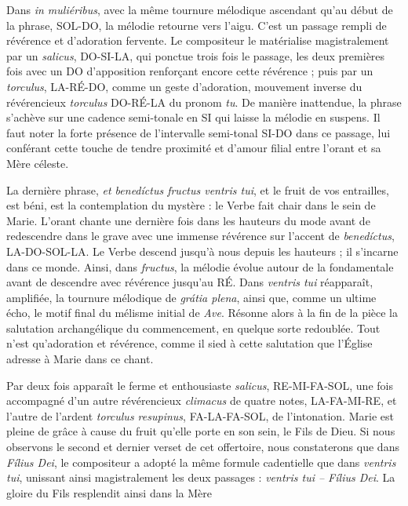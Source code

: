 \documentclass[Session2026.tex]{subfiles}
\begin{document}
Dans \emph{in muliéribus}, avec la même tournure mélodique ascendant
qu'au début de la phrase, SOL-DO, la mélodie retourne vers l'aigu. C'est
un passage rempli de révérence et d'adoration fervente. Le compositeur
le matérialise magistralement par un \emph{salicus}, DO-SI-LA, qui
ponctue trois fois le passage, les deux premières fois avec un DO
d'apposition renforçant encore cette révérence ; puis par un
\emph{torculus}, LA-RÉ-DO, comme un geste d'adoration, mouvement inverse
du révérencieux \emph{torculus} DO-RÉ-LA du pronom \emph{tu}. De manière
inattendue, la phrase s'achève sur une cadence semi-tonale en SI qui
laisse la mélodie en suspens. Il faut noter la forte présence de
l'intervalle semi-tonal SI-DO dans ce passage, lui conférant cette
touche de tendre proximité et d'amour filial entre l'orant et sa Mère
céleste.

La dernière phrase, \emph{et benedíctus fructus ventris tui}, et le
fruit de vos entrailles, est béni, est la contemplation du mystère : le
Verbe fait chair dans le sein de Marie. L'orant chante une dernière fois
dans les hauteurs du mode avant de redescendre dans le grave avec une
immense révérence sur l'accent de \emph{benedíctus}, LA-DO-SOL-LA. Le
Verbe descend jusqu'à nous depuis les hauteurs ; il s'incarne dans ce
monde. Ainsi, dans \emph{fructus}, la mélodie évolue autour de la
fondamentale avant de descendre avec révérence jusqu'au RÉ. Dans
\emph{ventris tui} réapparaît, amplifiée, la tournure mélodique de
\emph{grátia plena}, ainsi que, comme un ultime écho, le motif final du
mélisme initial de \emph{Ave}. Résonne alors à la fin de la pièce la
salutation archangélique du commencement, en quelque sorte redoublée.
Tout n'est qu'adoration et révérence, comme il sied à cette salutation
que l'Église adresse à Marie dans ce chant.

Par deux fois apparaît le ferme et enthousiaste \emph{salicus},
RE-MI-FA-SOL, une fois accompagné d'un autre révérencieux
\emph{climacus} de quatre notes, LA-FA-MI-RE, et l'autre de l'ardent
\emph{torculus resupinus}, FA-LA-FA-SOL, de l'intonation. Marie est
pleine de grâce à cause du fruit qu'elle porte en son sein, le Fils de
Dieu. Si nous observons le second et dernier verset de cet offertoire,
nous constaterons que dans \emph{Fílius Dei}, le compositeur a adopté la
même formule cadentielle que dans \emph{ventris tui}, unissant ainsi
magistralement les deux passages : \emph{ventris tui -- Fílius Dei}. La
gloire du Fils resplendit ainsi dans la Mère

\end{document}
